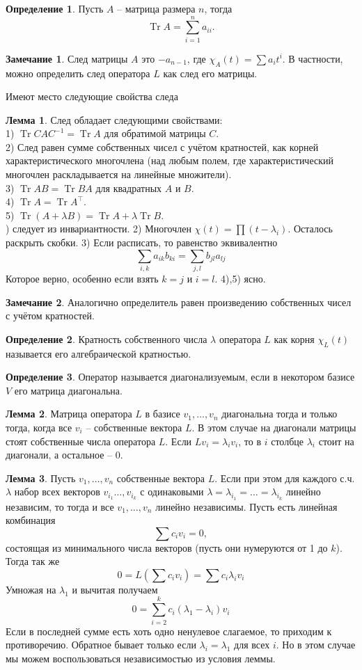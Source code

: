 \documentclass[10pt,a4paper,oneside]{book} %
\theoremstyle{definition}
\newtheorem*{rem}{Замечание}
\newtheorem*{defn}{Определение}
\newtheorem{lem}{Лемма}
\newcommand{\Tr}{\operatorname{Tr}}
\newcommand{\tr}{\operatorname{Tr}}
\def\dfn{\begin{defn}}
\def\edfn{\end{defn}}
\def\lm{\begin{lem}}
\def\elm{\end{lem}}
\def\rm{\begin{rem}}
\def\erm{\end{rem}}
\begin{document}
\dfn Пусть $A$ -- матрица размера $n$, тогда $$\Tr A=\sum_{i=1}^n a_{ii}.$$
\edfn

\rm След матрицы $A$ это $-a_{n-1}$, где $\chi_A(t)= \sum a_{i}t^i$. В частности, можно определить след  оператора $L$ как след его матрицы.
\erm

Имеют место следующие свойства следа

\lm След обладает следующими свойствами: \\
1) $\tr CAC^{-1}= \tr A$ для обратимой матрицы $C$.\\
2) След равен сумме собственных чисел с учётом кратностей, как корней характеристического многочлена (над любым полем, где характеристический многочлен раскладывается на линейные множители).\\
3) $\tr AB = \tr BA$ для квадратных $A$ и $B$.\\
4) $\tr A= \tr A^{\top}$.\\
5) $\tr( A + \lambda B) = \tr A + \lambda \tr B$.\\
) следует из инвариантности. 2) Многочлен $\chi(t)=\prod (t-\lambda_i)$. Осталось раскрыть скобки. 3) Если расписать, то равенство эквивалентно
$$\sum_{i,k} a_{ik}b_{ki}=\sum_{j,l} b_{jl}a_{lj}$$
Которое верно, особенно если взять $k=j$ и $i=l$. 4),5) ясно. \endproof
\elm

\rm Аналогично определитель равен произведению собственных чисел с учётом кратностей.
\erm

\dfn Кратность собственного числа $\lambda$ оператора $L$ как корня $\chi_L(t)$ называется его алгебраической кратностью.
\edfn









\dfn Оператор называется диагонализуемым,  если в некотором базисе $V$ его матрица диагональна.
\edfn

\lm Матрица оператора $L$ в базисе $v_1,\dots,v_n$ диагональна тогда и только тогда, когда все $v_i$ -- собственные вектора $L$. В этом случае на диагонали матрицы стоят собственные числа оператора $L$.
\proof Если $Lv_i=\lambda_iv_i$, то в $i$ столбце $\lambda_i$ стоит на диагонали, а остальное -- $0$.
\endproof
\elm

\lm Пусть $v_1,\dots,v_n$ собственные вектора $L$. Если при этом для каждого с.ч. $\lambda$ набор всех векторов $v_{i_1}\dots,v_{i_k}$ с одинаковыми $\lambda=\lambda_{i_1}=\dots=\lambda_{i_k}$  линейно независим, то тогда и все $v_1,\dots,v_n$ линейно независимы.
\proof Пусть есть линейная комбинация $$\sum c_i v_i=0,$$
состоящая из минимального числа векторов (пусть они нумеруются от 1 до $k$). Тогда так же
$$0=L\left(\sum c_i v_i\right)= \sum c_i \lambda_i v_i$$
Умножая на $\lambda_1$ и вычитая получаем $$0=\sum_{i=2}^k c_i(\lambda_1-\lambda_i)v_i$$
Если в последней сумме есть хоть одно ненулевое слагаемое, то приходим к противоречию. Обратное бывает только если $\lambda_i=\lambda_1$ для всех $i$. Но в этом случае мы можем воспользоваться независимостью из условия леммы.
\endproof
\elm
\end{document}
